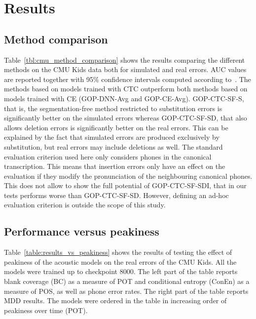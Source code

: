 \section{Results}
\label{sec:results}
\subsection{Method comparison}
Table~\ref{tbl:cmu_method_comparison} shows the results comparing the different methods on the CMU Kids data both for simulated and real errors.
AUC values are reported together with 95\% confidence intervals computed according to~\cite{HanleyAndMcNeil1982ROC-CI}.
The methods based on models trained with CTC outperform both methods based on models trained with CE (GOP-DNN-Avg and GOP-CE-Avg).
GOP-CTC-SF-S, that is, the segmentation-free method restricted to substitution errors is significantly better on the simulated errors whereas GOP-CTC-SF-SD, that also allows deletion errors is significantly better on the real errors.
This can be explained by the fact that simulated errors are produced exclusively by substitution, but real errors may include deletions as well.
The standard evaluation criterion used here only considers phones in the canonical transcription.
This means that insertion errors only have an effect on the evaluation if they modify the pronunciation of the neighbouring canonical phones.
This does not allow to show the full potential of GOP-CTC-SF-SDI, that in our tests performs worse than GOP-CTC-SF-SD.
However, defining an ad-hoc evaluation criterion is outside the scope of this study.

\begin{table}
\centering
\caption{Phone Recognition and Pronunciation Assessment Results vs Peakiness.
}
\label{table:results_vs_peakiness}
% 

\end{table}

\subsection{Performance versus peakiness}
Table~\ref{table:results_vs_peakiness} shows the results of testing the effect of peakiness of the acoustic models on the real errors of the CMU Kids.
All the models were trained up to checkpoint 8000.
The left part of the table reports blank coverage (BC) as a measure of POT and conditional entropy (ConEn) as a measure of POS, as well as phone error rates.
The right part of the table reports MDD results.
The models were ordered in the table in increasing order of peakiness over time (POT).

